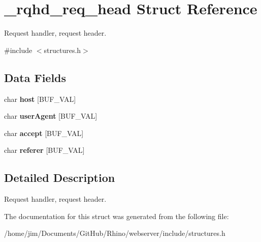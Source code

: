 \hypertarget{struct__rqhd__req__head}{}\section{\+\_\+rqhd\+\_\+req\+\_\+head Struct Reference}
\label{struct__rqhd__req__head}


Request handler, request header.  




{\ttfamily \#include $<$structures.\+h$>$}

\subsection*{Data Fields}
\begin{DoxyCompactItemize}
\item 
\hypertarget{struct__rqhd__req__head_a038f132d35efc004445dd675509a6646}{}char {\bfseries host} \mbox{[}B\+U\+F\+\_\+\+V\+A\+L\mbox{]}\label{struct__rqhd__req__head_a038f132d35efc004445dd675509a6646}

\item 
\hypertarget{struct__rqhd__req__head_af61412bb4bc6ab6676c6b455f755ae4f}{}char {\bfseries user\+Agent} \mbox{[}B\+U\+F\+\_\+\+V\+A\+L\mbox{]}\label{struct__rqhd__req__head_af61412bb4bc6ab6676c6b455f755ae4f}

\item 
\hypertarget{struct__rqhd__req__head_ae9a856190aaa572d51743ecfe9804624}{}char {\bfseries accept} \mbox{[}B\+U\+F\+\_\+\+V\+A\+L\mbox{]}\label{struct__rqhd__req__head_ae9a856190aaa572d51743ecfe9804624}

\item 
\hypertarget{struct__rqhd__req__head_a023b09ff3a60ba158a59a46caa38a12c}{}char {\bfseries referer} \mbox{[}B\+U\+F\+\_\+\+V\+A\+L\mbox{]}\label{struct__rqhd__req__head_a023b09ff3a60ba158a59a46caa38a12c}

\end{DoxyCompactItemize}


\subsection{Detailed Description}
Request handler, request header. 

The documentation for this struct was generated from the following file\+:\begin{DoxyCompactItemize}
\item 
/home/jim/\+Documents/\+Git\+Hub/\+Rhino/webserver/include/structures.\+h\end{DoxyCompactItemize}
